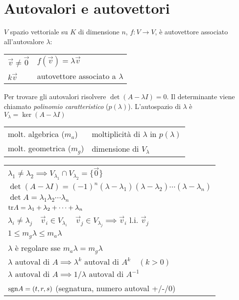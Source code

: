 \section{Autovalori e autovettori}

$V$ spazio vettoriale su $K$ di dimensione $n$, $f: V \rightarrow V$,  è autovettore associato all'autovalore $\lambda$:
\begin{tabular}{ll}
	$\vec{v} \ne \vec{0}$ & $f(\vec{v}) = \lambda \vec{v}$ \\
	$k\vec{v}$ & autovettore associato a $\lambda$
\end{tabular}

Per trovare gli autovalori risolvere $\det(A-\lambda I) = 0$. Il determinante viene chiamato \emph{polinomio caratteristico} ($p(\lambda)$).
L'autospazio di $\lambda$ è $V_\lambda = \ker(A-\lambda I)$

\begin{tabular}{ll}
	molt. algebrica ($m_a$) & moltiplicità di $\lambda$ in $p(\lambda)$ \\
	molt. geometrica ($m_g$) & dimensione di $V_\lambda$
\end{tabular}

\begin{tabular}{l}
	$\lambda_1 \ne \lambda_2 \implies V_{\lambda_1} \cap V_{\lambda_2} = \{\vec{0}\}$ \\
	$\det(A-\lambda I) = (-1)^n (\lambda - \lambda_1) (\lambda - \lambda_2) \cdots (\lambda - \lambda_n)$ \\
	$\det A = \lambda_1 \lambda_2 \cdots \lambda_n$ \\
	$\mathrm{tr} A = \lambda_1 + \lambda_2 + \cdots + \lambda_n$ \\
	$\lambda_i \ne \lambda_j \quad \vec{v}_i \in V_{\lambda_i} \quad \vec{v}_j \in V_{\lambda_j} \implies \vec{v}_i$ l.i. $\vec{v}_j$ \\
	$1 \le m_g \lambda \le m_a \lambda$ \\
	$\lambda$ è regolare sse $m_a \lambda = m_g \lambda$ \\
	$\lambda \text{ autoval di } A \implies \lambda^k \text{ autoval di } A^k \quad (k > 0)$ \\
	$\lambda \text{ autoval di } A \implies 1/\lambda \text{ autoval di } A^{-1}$ \\
	$\mathrm{sgn} A = (t,r,s)$ (segnatura, numero autoval +/-/0)
\end{tabular}